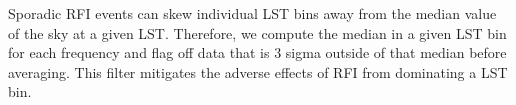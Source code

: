 \documentclass[twocolumn,numberedappendix]{emulateapj}
\begin{document}
Sporadic RFI events can skew individual LST bins away from the median value of
the sky at a given LST. Therefore, we compute the median in a given LST bin for
each frequency and flag off data that is 3 sigma outside of that median before
averaging. This filter mitigates the adverse effects of RFI from dominating a
LST bin. 

%
%
%
%
\end{document}
